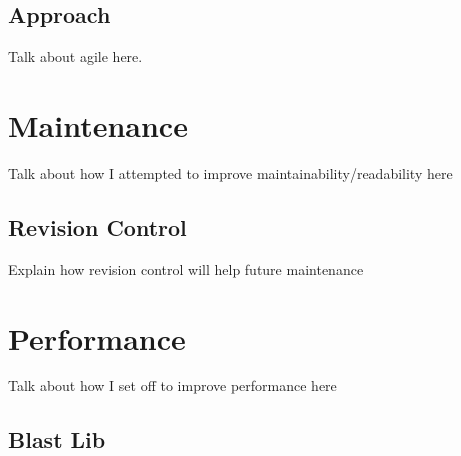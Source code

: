 \section{Approach}
Talk about agile here.

\chapter{Maintenance}
Talk about how I attempted to improve maintainability/readability here

\section{Revision Control}
Explain how revision control will help future maintenance 

\chapter{Performance}
Talk about how I set off to improve performance here

\section{Blast Lib}
